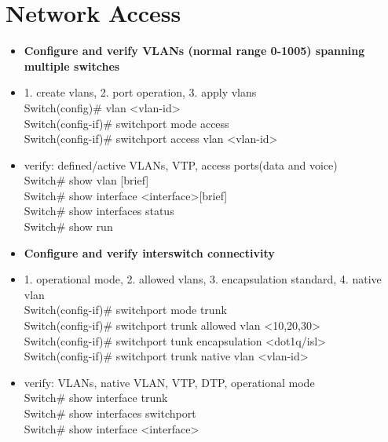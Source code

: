 \documentclass{article}
\begin{document}
\section{Network Access}
\begin{itemize}
  \item \textbf{Configure and verify VLANs (normal range 0-1005) spanning multiple switches}
	\item[] 1. create vlans, 2. port operation, 3. apply vlans\\
		Switch(config)\# vlan \textless vlan-id\textgreater\\
		Switch(config-if)\# switchport mode access\\
		Switch(config-if)\# switchport access vlan \textless vlan-id\textgreater
  	\item[] verify: defined/active VLANs, VTP, access ports(data and voice)\\
  		Switch\# show vlan [brief]\\
  		Switch\# show interface \textless interface\textgreater [brief]\\
  		Switch\# show interfaces status\\
  		Switch\# show run
  	
  \item \textbf{Configure and verify interswitch connectivity}
  	\item[] 1. operational mode, 2. allowed vlans, 3. encapsulation standard, 4. native vlan\\
  		Switch(config-if)\# switchport mode trunk\\
  		Switch(config-if)\# switchport trunk allowed vlan \textless 10,20,30\textgreater\\
  		Switch(config-if)\# switchport tunk encapsulation \textless dot1q/isl\textgreater\\
  		Switch(config-if)\# switchport trunk native vlan \textless vlan-id\textgreater
  	\item[] verify: VLANs, native VLAN, VTP, DTP, operational mode \\
  		Switch\# show interface trunk\\
  		Switch\# show interfaces switchport\\
  		Switch\# show interface \textless interface\textgreater
  		

\end{itemize}
\end{document}
